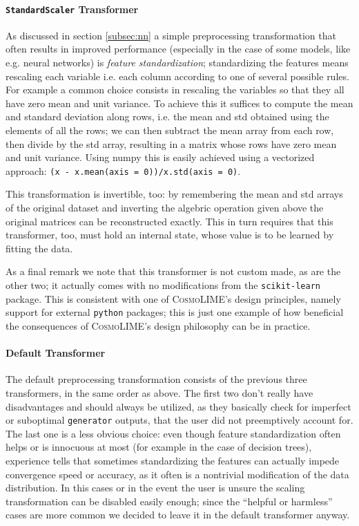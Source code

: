 \paragraph{\texttt{StandardScaler} Transformer}
As discussed in section \ref{subsec:nn} a simple preprocessing transformation that often results in improved performance (especially in the case of some models, like e.g. neural networks) is \emph{feature standardization}; standardizing the features means rescaling each variable i.e. each column according to one of several possible rules. For example a common choice consists in rescaling the variables so that they all have zero mean and unit variance. To achieve this it suffices to compute the mean and standard deviation along rows, i.e. the mean and std obtained using the elements of all the rows; we can then subtract the mean array from each row, then divide by the std array, resulting in a matrix whose rows have zero mean and unit variance.
Using numpy this is easily achieved using a vectorized approach: \texttt{(x - x.mean(axis = 0))/x.std(axis = 0)}.

This transformation is invertible, too: by remembering the mean and std arrays of the original dataset and inverting the algebric operation given above the original matrices can be reconstructed exactly. This in turn requires that this transformer, too, must hold an internal state, whose value is to be learned by fitting the data.

As a final remark we note that this transformer is not custom made, as are the other two; it actually comes with no modifications from the \texttt{scikit-learn} package. This is consistent with one of \textsc{CosmoLIME}'s design principles, namely support for external \texttt{python} packages; this is just one example of how beneficial the consequences of \textsc{CosmoLIME}'s design philosophy can be in practice.

\paragraph{Default Transformer}
The default preprocessing transformation consists of the previous three transformers, in the same order as above. The first two don't really have disadvantages and should always be utilized, as they basically check for imperfect or suboptimal \texttt{generator} outputs, that the user did not preemptively account for. The last one is a less obvious choice: even though feature standardization often helps or is innocuous at most (for example in the case of decision trees), experience tells that sometimes standardizing the features can actually impede convergence speed or accuracy, as it often is a nontrivial modification of the data distribution. In this cases or in the event the user is unsure the scaling transformation can be disabled easily enough; since the ``helpful or harmless'' cases are more common we decided to leave it in the default transformer anyway.

